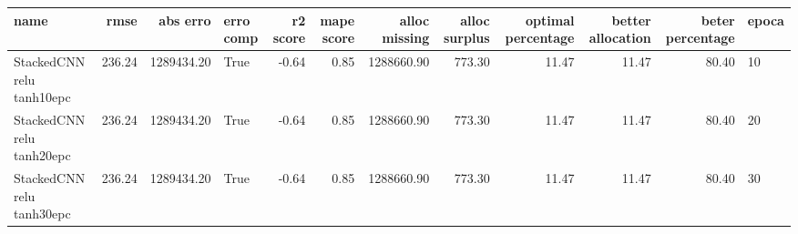 \begin{tabular}{lrrlrrrrrrrl}
\toprule
name & rmse & abs erro & erro comp & r2 score & mape score & alloc missing & alloc surplus & optimal percentage & better allocation & beter percentage & epoca \\
\midrule
StackedCNN relu tanh10epc & 236.24 & 1289434.20 & True & -0.64 & 0.85 & 1288660.90 & 773.30 & 11.47 & 11.47 & 80.40 & 10 \\
StackedCNN relu tanh20epc & 236.24 & 1289434.20 & True & -0.64 & 0.85 & 1288660.90 & 773.30 & 11.47 & 11.47 & 80.40 & 20 \\
StackedCNN relu tanh30epc & 236.24 & 1289434.20 & True & -0.64 & 0.85 & 1288660.90 & 773.30 & 11.47 & 11.47 & 80.40 & 30 \\
\bottomrule
\end{tabular}
